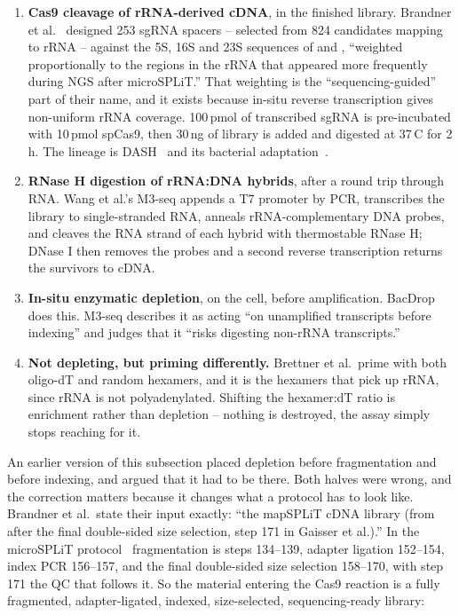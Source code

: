 \begin{enumerate}
\item \textbf{Cas9 cleavage of rRNA-derived cDNA}, in the finished library.
  Brandner et al.\ \citep{brandnerPooledSinglecellCRISPRa2025} designed 253 sgRNA
  spacers -- selected from 824 candidates mapping to rRNA -- against the 5S, 16S
  and 23S sequences of  and , ``weighted
  proportionally to the regions in the rRNA that appeared more frequently during
  NGS after microSPLiT.'' That weighting is the ``sequencing-guided'' part of
  their name, and it exists because in-situ reverse transcription gives
  non-uniform rRNA coverage. 100\,pmol of transcribed sgRNA is pre-incubated
  with 10\,pmol spCas9, then 30\,ng of library is added and digested at
  37\,\textdegree C for 2\,h. The lineage is DASH~\citep{guDepletionAbundantSequences2016}
  and its bacterial adaptation~\citep{prezzaImprovedBacterialRNAseq2020}.
\item \textbf{RNase H digestion of rRNA:DNA hybrids}, after a round trip through
  RNA. Wang et al.'s M3-seq \citep{wangSinglecellMassivelyparallelMultiplexed2023}
  appends a T7 promoter by PCR, transcribes the library to single-stranded RNA,
  anneals rRNA-complementary DNA probes, and cleaves the RNA strand of each
  hybrid with thermostable RNase H; DNase I then removes the probes and a second
  reverse transcription returns the survivors to cDNA.
\item \textbf{In-situ enzymatic depletion}, on the cell, before amplification.
  BacDrop does this. M3-seq describes it as acting ``on unamplified transcripts
  before indexing'' and judges that it ``risks digesting non-rRNA transcripts.''
\item \textbf{Not depleting, but priming differently.} Brettner et al.\ prime
  with both oligo-dT and random hexamers, and it is the hexamers that pick up
  rRNA, since rRNA is not polyadenylated. Shifting the hexamer:dT ratio is
  enrichment rather than depletion -- nothing is destroyed, the assay simply
  stops reaching for it.
\end{enumerate}

 An earlier version of this
subsection placed depletion before fragmentation and before indexing, and argued
that it had to be there. Both halves were wrong, and the correction matters
because it changes what a protocol has to look like. Brandner et al.\ state their
input exactly: ``the mapSPLiT cDNA library (from after the final double-sided
size selection, step 171 in Gaisser et al.).'' In the microSPLiT
protocol~\citep{gaisserHighthroughputSinglecellTranscriptomics2024} fragmentation
is steps 134--139, adapter ligation 152--154, index PCR 156--157, and the final
double-sided size selection 158--170, with step 171 the QC that follows it. So
the material entering the Cas9 reaction is a fully fragmented, adapter-ligated,
indexed, size-selected, sequencing-ready library:

